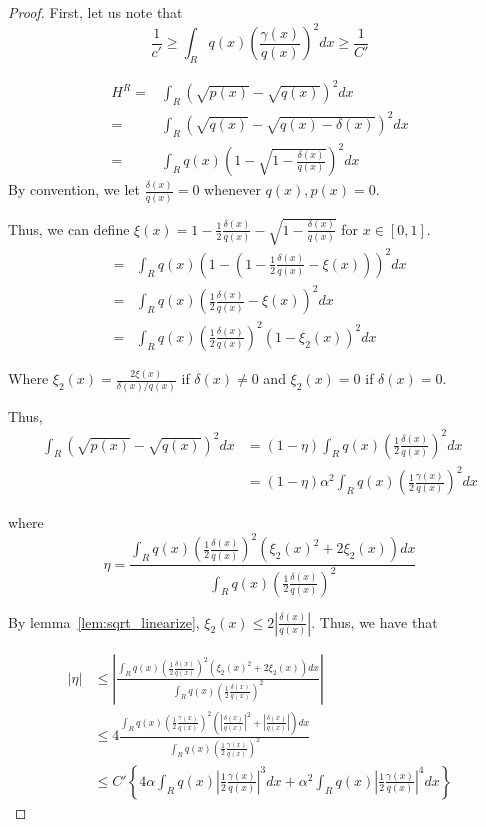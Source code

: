 \begin{proof}


First, let us note that
\[
\frac{1}{c'} \geq \int_R q(x) \left( \frac{\gamma(x)}{q(x)} \right)^2 dx \geq \frac{1}{C'}
\]


\begin{align*}
H^R = &\int_R (\sqrt{p(x)} - \sqrt{q(x)})^2 dx \\
=& \int_R ( \sqrt{q(x)} - \sqrt{q(x) - \delta(x)} )^2 dx \\
=& \int_R q(x) \left( 1 - \sqrt{ 1 - \frac{\delta(x)}{q(x)}} \right)^2 dx 
\end{align*}
By convention, we let $\frac{\delta(x)}{q(x)} = 0$ whenever $q(x), p(x) = 0$. 

Thus, we can define $\xi(x) = 1- \frac{1}{2} \frac{\delta(x)}{q(x)} - \sqrt{ 1 - \frac{\delta(x)}{q(x)}}$ for $x \in [0,1]$. 
\begin{align*}
=& \int_R q(x) \left( 1 - (1 - \frac{1}{2} \frac{\delta(x)}{q(x)} - \xi(x) ) \right)^2 dx \\
=& \int_R q(x) \left( \frac{1}{2} \frac{\delta(x)}{q(x)} - \xi(x) \right)^2 dx\\ 
=& \int_R q(x) \left( \frac{1}{2} \frac{\delta(x)}{q(x)} \right)^2 \left( 1 - \xi_2(x) \right)^2 dx 
\end{align*}

Where $\xi_2(x) = \frac{2\xi(x)}{\delta(x)/q(x)}$ if $\delta(x) \neq 0$ and $\xi_2(x) =0$ if $\delta(x) = 0$. 

Thus,
\begin{align*}
\int_R \left( \sqrt{p(x)} - \sqrt{q(x)} \right)^2 dx &= (1 - \eta) \int_R q(x) \left( \frac{1}{2} \frac{\delta(x)}{q(x)} \right)^2 dx \\
  &= (1 - \eta) \alpha^2  \int_R q(x) \left( \frac{1}{2} \frac{\gamma(x)}{q(x)} \right)^2 dx
\end{align*}

where 
\[
\eta = \frac{\int_R q(x) \left( \frac{1}{2} \frac{\delta(x)}{q(x)} \right)^2 (\xi_2(x)^2 + 2\xi_2(x)) dx }
           { \int_R q(x) \left( \frac{1}{2} \frac{\delta(x)}{q(x)} \right)^2 }
\]

By lemma~\ref{lem:sqrt_linearize}, $\xi_2(x) \leq 2 \left| \frac{ \delta(x)}{q(x)} \right|$. Thus, we have that

\begin{align*}
| \eta | &\leq  \left| \frac{\int_R q(x) \left( \frac{1}{2} \frac{\delta(x)}{q(x)} \right)^2 (\xi_2(x)^2 + 2\xi_2(x)) dx }
           { \int_R q(x) \left( \frac{1}{2} \frac{\delta(x)}{q(x)} \right)^2 } \right| \\
    &\leq 4 \frac{\int_R q(x) \left( \frac{1}{2} \frac{\gamma(x)}{q(x)} \right)^2 
                  \left( \left|\frac{\delta(x)}{q(x)} \right|^2 + \left| \frac{\delta(x)}{q(x)} \right| \right)  dx }
           { \int_R q(x) \left( \frac{1}{2} \frac{\gamma(x)}{q(x)} \right)^2 } \\
    &\leq C' \left\{ 4 \alpha \int_R q(x) \left| \frac{1}{2} \frac{\gamma(x)}{q(x)} \right|^3 dx + 
                           \alpha^2 \int_R q(x) \left| \frac{1}{2} \frac{\gamma(x)}{q(x)} \right|^4 dx \right\}
\end{align*}


\end{proof}
